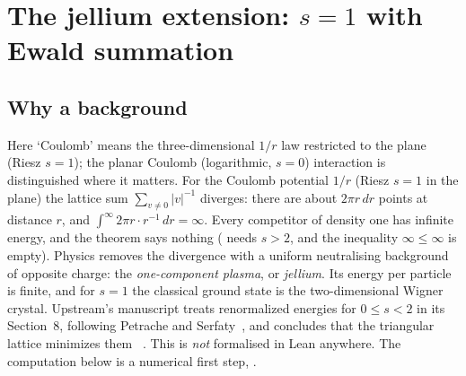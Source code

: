 \section{The jellium extension: $s=1$ with Ewald summation}\label{sec:num-jellium}

\subsection{Why a background}
Here `Coulomb' means the three-dimensional $1/r$ law restricted to the plane (Riesz $s=1$); the planar Coulomb
(logarithmic, $s=0$) interaction is distinguished where it matters. For the Coulomb potential $1/r$ (Riesz $s=1$ in the plane) the lattice sum $\sum_{v\ne0}|v|^{-1}$ diverges: there are
about $2\pi r\,dr$ points at distance $r$, and $\int^\infty2\pi r\cdot r^{-1}\,dr=\infty$. Every competitor of
density one has infinite energy, and the theorem says nothing ( needs $s>2$, and
the inequality $\infty\le\infty$ is empty). Physics removes the divergence with a uniform neutralising background of
opposite charge: the \emph{one-component plasma}, or \emph{jellium}. Its energy per particle is finite, and for $s=1$ the
classical ground state is the two-dimensional Wigner crystal. Upstream's manuscript treats renormalized energies for
$0\le s<2$ in its Section~8, following Petrache and Serfaty~\cite{ps}, and concludes that the triangular lattice
minimizes them~\cite{oai} \tierL. This is \emph{not} formalised in Lean anywhere. The computation below is a numerical
first step, \tierX.

